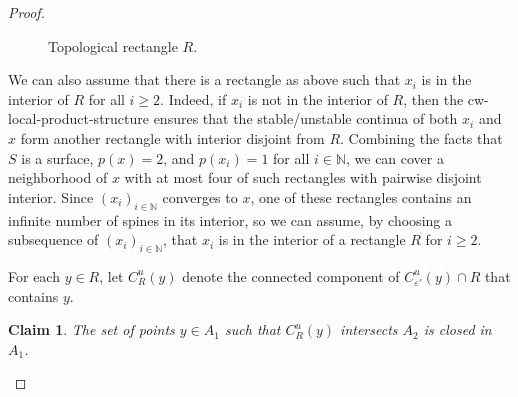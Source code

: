 \documentclass{amsart}
\theoremstyle{plain}
\newtheorem{claim}[theorem]{Claim}
\theoremstyle{definition}
\newcommand{\N}{\mathbb{N}}
\newcommand{\eps}{\varepsilon}
\begin{document}
\begin{proof}
\begin{figure}[H]
        \caption{Topological rectangle $R$.}
        \label{fig:toprectangle}
    \end{figure}
We can also assume that there is a rectangle as above such that $x_i$ is in the interior of $R$ for all $i\geq2$. Indeed, if $x_i$ is not in the interior of $R$, then the cw-local-product-structure ensures that the stable/unstable continua of both $x_i$ and $x$ form another rectangle with interior disjoint from $R$. Combining the facts that $S$ is a surface, $p(x)=2$, and $p(x_i)=1$ for all $i\in\N$, we can cover a neighborhood of $x$ with at most four of such rectangles with pairwise disjoint interior. Since $(x_i)_{i\in \N}$ converges to $x$, one of these rectangles contains an infinite number of spines in its interior, so we can assume, by choosing a subsequence of $(x_i)_{i\in \N}$, that $x_i$ is in the interior of a rectangle $R$ for $i\geq2$.

For each $y\in R$, let $C^u_R(y)$ denote the connected component of $C^u_{\eps'}(y)\cap R$ that contains $y$. 


\begin{claim}\label{claim}
        The set of points $y\in A_1$ such that $C^u_R(y)$ intersects $A_2$ is closed in $A_1$.
\end{claim}    


\end{proof}
\end{document}
